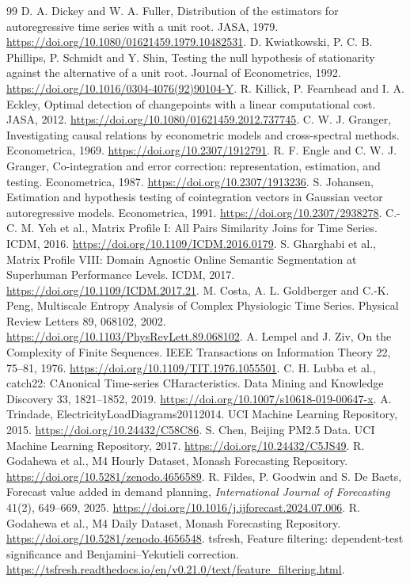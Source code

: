 \documentclass[11pt,a4paper]{article}
\begin{document}
\begin{thebibliography}{99}
 D. A. Dickey and W. A. Fuller, Distribution of the estimators for autoregressive time series with a unit root. JASA, 1979. \url{https://doi.org/10.1080/01621459.1979.10482531}.
 D. Kwiatkowski, P. C. B. Phillips, P. Schmidt and Y. Shin, Testing the null hypothesis of stationarity against the alternative of a unit root. Journal of Econometrics, 1992. \url{https://doi.org/10.1016/0304-4076(92)90104-Y}.
 R. Killick, P. Fearnhead and I. A. Eckley, Optimal detection of changepoints with a linear computational cost. JASA, 2012. \url{https://doi.org/10.1080/01621459.2012.737745}.
 C. W. J. Granger, Investigating causal relations by econometric models and cross-spectral methods. Econometrica, 1969. \url{https://doi.org/10.2307/1912791}.
 R. F. Engle and C. W. J. Granger, Co-integration and error correction: representation, estimation, and testing. Econometrica, 1987. \url{https://doi.org/10.2307/1913236}.
 S. Johansen, Estimation and hypothesis testing of cointegration vectors in Gaussian vector autoregressive models. Econometrica, 1991. \url{https://doi.org/10.2307/2938278}.
 C.-C. M. Yeh et al., Matrix Profile I: All Pairs Similarity Joins for Time Series. ICDM, 2016. \url{https://doi.org/10.1109/ICDM.2016.0179}.
 S. Gharghabi et al., Matrix Profile VIII: Domain Agnostic Online Semantic Segmentation at Superhuman Performance Levels. ICDM, 2017. \url{https://doi.org/10.1109/ICDM.2017.21}.
 M. Costa, A. L. Goldberger and C.-K. Peng, Multiscale Entropy Analysis of Complex Physiologic Time Series. Physical Review Letters 89, 068102, 2002. \url{https://doi.org/10.1103/PhysRevLett.89.068102}.
 A. Lempel and J. Ziv, On the Complexity of Finite Sequences. IEEE Transactions on Information Theory 22, 75--81, 1976. \url{https://doi.org/10.1109/TIT.1976.1055501}.
 C. H. Lubba et al., catch22: CAnonical Time-series CHaracteristics. Data Mining and Knowledge Discovery 33, 1821--1852, 2019. \url{https://doi.org/10.1007/s10618-019-00647-x}.
 A. Trindade, ElectricityLoadDiagrams20112014. UCI Machine Learning Repository, 2015. \url{https://doi.org/10.24432/C58C86}.
 S. Chen, Beijing PM2.5 Data. UCI Machine Learning Repository, 2017. \url{https://doi.org/10.24432/C5JS49}.
 R. Godahewa et al., M4 Hourly Dataset, Monash Forecasting Repository. \url{https://doi.org/10.5281/zenodo.4656589}.
 R. Fildes, P. Goodwin and S. De Baets, Forecast value added in demand planning, \emph{International Journal of Forecasting} 41(2), 649--669, 2025. \url{https://doi.org/10.1016/j.ijforecast.2024.07.006}.
 R. Godahewa et al., M4 Daily Dataset, Monash Forecasting Repository. \url{https://doi.org/10.5281/zenodo.4656548}.
 tsfresh, Feature filtering: dependent-test significance and Benjamini--Yekutieli correction. \url{https://tsfresh.readthedocs.io/en/v0.21.0/text/feature_filtering.html}.


\end{thebibliography}
\end{document}
